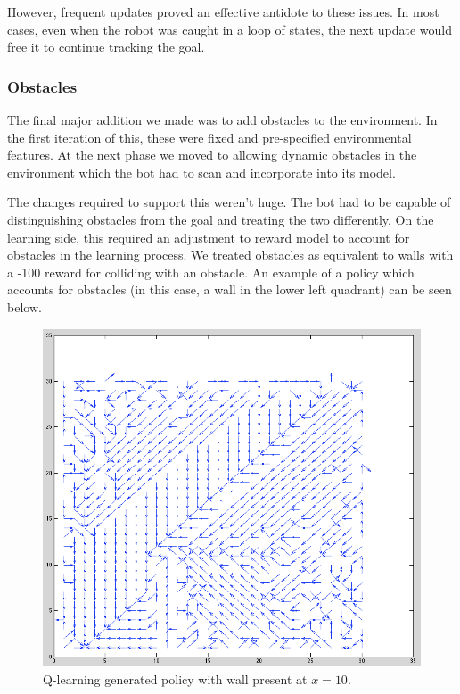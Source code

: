 \documentclass{aiaa-tc}%
\begin{document}
However, frequent updates proved an effective antidote to these
issues. In most cases, even when the robot was caught in a loop of
states, the next update would free it to continue tracking the goal.

\subsubsection{Obstacles}

The final major addition we made was to add obstacles to the
environment. In the first iteration of this, these were fixed and
pre-specified environmental features. At the next phase we moved to
allowing dynamic obstacles in the environment which the bot had to
scan and incorporate into its model.

The changes required to support this weren't huge. The bot had to be
capable of distinguishing obstacles from the goal and treating the two
differently. On the learning side, this required an adjustment to
reward model to account for obstacles in the learning
process. We treated obstacles as equivalent to walls with a -100
reward for colliding with an obstacle. An example of a policy which
accounts for obstacles (in this case, a wall in the lower left quadrant) can be
seen below.

\vspace{.3in}

\begin{figure}[htbp]
  \centering
  \includegraphics[width=\linewidth]{images/Wall2.png} 
  \caption{Q-learning generated policy with wall present at $x=10$.}
  \label{fig:obstacleQ}
\end{figure}
\clearpage
\end{document}
